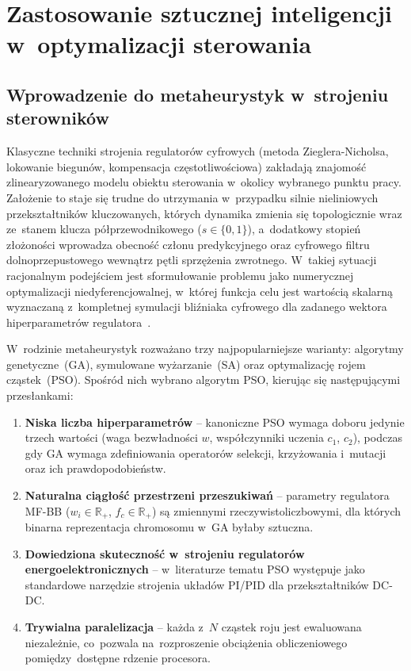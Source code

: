 \chapter{Zastosowanie sztucznej inteligencji w~optymalizacji sterowania}
\label{ch:ai}


\section{Wprowadzenie do metaheurystyk w~strojeniu sterowników}
\label{sec:metaheurystyki}

Klasyczne techniki strojenia regulatorów cyfrowych (metoda Zieglera-Nicholsa, lokowanie biegunów, kompensacja częstotliwościowa) zakładają znajomość zlinearyzowanego modelu obiektu sterowania w~okolicy wybranego punktu pracy. Założenie to staje się trudne do utrzymania w~przypadku silnie nieliniowych przekształtników kluczowanych, których dynamika zmienia się topologicznie wraz ze~stanem klucza półprzewodnikowego ($s\in\{0,1\}$), a~dodatkowy stopień złożoności wprowadza obecność członu predykcyjnego oraz cyfrowego filtru dolnoprzepustowego wewnątrz pętli sprzężenia zwrotnego. W~takiej sytuacji racjonalnym podejściem jest sformułowanie problemu jako numerycznej optymalizacji niedyferencjowalnej, w~której funkcja celu jest wartością skalarną wyznaczaną z~kompletnej symulacji bliźniaka cyfrowego dla zadanego wektora hiperparametrów regulatora~\cite{yang2014}.

W~rodzinie metaheurystyk rozważano trzy najpopularniejsze warianty: algorytmy genetyczne~(GA), symulowane wyżarzanie~(SA) oraz optymalizację rojem cząstek~(PSO). Spośród nich wybrano algorytm PSO, kierując się następującymi przesłankami:
\begin{enumerate}
    \item \textbf{Niska liczba hiperparametrów} -- kanoniczne PSO wymaga doboru jedynie trzech wartości (waga bezwładności $w$, współczynniki uczenia $c_1$, $c_2$), podczas gdy GA wymaga zdefiniowania operatorów selekcji, krzyżowania i~mutacji oraz ich prawdopodobieństw.
    \item \textbf{Naturalna ciągłość przestrzeni przeszukiwań} -- parametry regulatora MF-BB ($w_i\in\mathbb{R}_{+}$, $f_c\in\mathbb{R}_{+}$) są zmiennymi rzeczywistoliczbowymi, dla których binarna reprezentacja chromosomu w~GA byłaby sztuczna.
    \item \textbf{Dowiedziona skuteczność w~strojeniu regulatorów energoelektronicznych} -- w~literaturze tematu PSO występuje jako standardowe narzędzie strojenia układów PI/PID dla przekształtników DC-DC.
    \item \textbf{Trywialna paralelizacja} -- każda z~$N$ cząstek roju jest ewaluowana niezależnie, co~pozwala na~rozproszenie obciążenia obliczeniowego pomiędzy~dostępne rdzenie procesora.
\end{enumerate}

